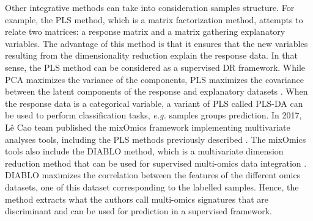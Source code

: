 Other integrative methods can take into consideration samples structure. For example, the \gls{PLS} method, which is a matrix factorization method, attempts to relate two matrices: a response matrix and a matrix gathering explanatory variables. The advantage of this method is that it ensures that the new variables resulting from the dimensionality reduction explain the response data.
In that sense, the \gls{PLS} method can be considered as a supervised \gls{DR} framework. While \gls{PCA} maximizes the variance of the components, \gls{PLS} maximizes the covariance between the latent components of the response and explanatory datasets \cite{Kim,Hastie2017}. 
When the response data is a categorical variable, a variant of \gls{PLS} called \gls{PLS-DA} can be used to perform classification tasks, \textit{e.g.} samples groups prediction. 
In 2017, Lê Cao team published the mixOmics framework implementing multivariate analyses tools, including the \gls{PLS} methods previously described \cite{Rohart2017}. The mixOmics tools also include the \gls{DIABLO} method, which is a multivariate dimension reduction method that can be used for supervised multi-omics data integration \cite{Singh2019}. \gls{DIABLO} maximizes the correlation between the features of the different omics datasets, one of this dataset corresponding to the labelled samples. Hence, the method extracts what the authors call multi-omics signatures that are discriminant and can be used for prediction in a supervised framework.  %


